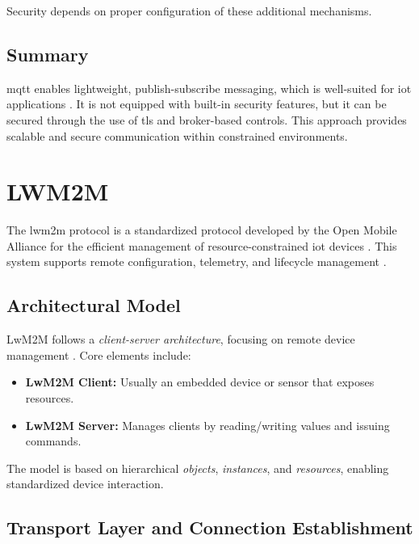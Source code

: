 \documentclass[12pt, english, openany]{book}
\begin{document}
Security depends on proper configuration of these additional mechanisms.

\subsection{Summary}

\gls{mqtt} enables lightweight, publish-subscribe messaging, which is well-suited for \gls{iot} applications \parencite{naik2017choice}. It is not equipped with built-in security features, but it can be secured through the use of \gls{tls} and broker-based controls. This approach provides scalable and secure communication within constrained environments.


\section{LWM2M} \label{sec:lwm2m}

The \gls{lwm2m} protocol is a standardized protocol developed by the Open Mobile Alliance for the efficient management of resource-constrained \gls{iot} devices \parencite{oma_lwm2m_2017}. This system supports remote configuration, telemetry, and lifecycle management \parencite{LWM2M_WIKI}.

\subsection{Architectural Model}

LwM2M follows a \textit{client-server architecture}, focusing on remote device management \parencite{oma_lwm2m_2017}. Core elements include:

\begin{itemize}
    \item \textbf{LwM2M Client:} Usually an embedded device or sensor that exposes resources.
    \item \textbf{LwM2M Server:} Manages clients by reading/writing values and issuing commands.
\end{itemize}

The model is based on hierarchical \textit{objects}, \textit{instances}, and \textit{resources}, enabling standardized device interaction.

\subsection{Transport Layer and Connection Establishment}
\end{document}
